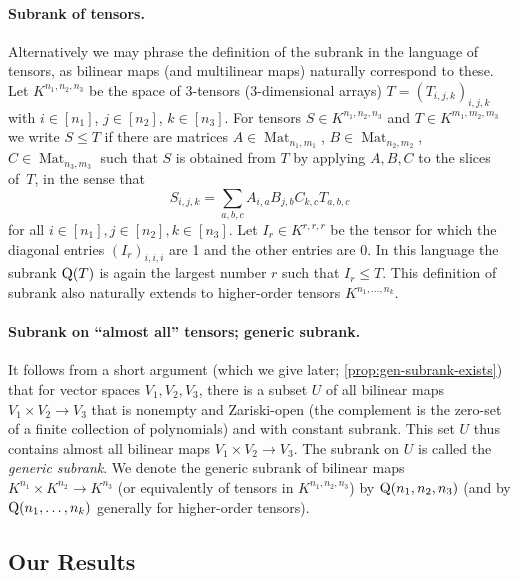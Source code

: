 \documentclass[11pt]{article}
\theoremstyle{definition}
\theoremstyle{remark}
\newcommand{\subrank}{{\rm Q}}
\newcommand{\gensubrank}{{\rm Q}}
\newcommand{\Mat}{\operatorname{Mat}}
\begin{document}
\paragraph{Subrank of tensors.} Alternatively we may phrase the definition of the subrank in the language of tensors, as bilinear maps (and multilinear maps) naturally correspond to these. Let $K^{n_1, n_2, n_3}$ be the space of 3-tensors (3-dimensional arrays) $T = (T_{i,j,k})_{i,j,k}$ with $i \in [n_1]$, $j \in [n_2]$, $k \in [n_3]$. For tensors $S \in K^{n_1, n_2, n_3}$ and $T \in K^{m_1, m_2, m_3}$ we write $S \leq T$ if there are matrices $A \in \Mat_{n_1, m_1}$, $B \in \Mat_{n_2, m_2}$, $C \in \Mat_{n_3, m_3}$ such that $S$ is obtained from $T$ by applying $A,B,C$ to the slices of~$T$, in the sense that
\[
S_{i,j,k} = \sum_{a,b,c} A_{i,a} B_{j,b} C_{k,c} T_{a,b,c}
\]
for all $i \in [n_1], j \in [n_2], k \in [n_3]$. Let $I_r \in K^{r,r,r}$ be the tensor for which the diagonal entries $(I_r)_{i,i,i}$ are 1 and the other entries are 0. In this language the subrank $\subrank(T)$ is again the largest number $r$ such that $I_r \leq T$. This definition of subrank also naturally extends to higher-order tensors $K^{n_1, \ldots, n_k}$.

\paragraph{Subrank on ``almost all'' tensors; generic subrank.}
It follows from a short argument (which we give later; \autoref{prop:gen-subrank-exists}) that for vector spaces $V_1,V_2,V_3$, there is a subset $U$ of all bilinear maps $V_1 \times V_2 \to V_3$ that is nonempty and Zariski-open (the complement is the zero-set of a finite collection of polynomials) and with constant subrank. This set $U$ thus contains almost all bilinear maps $V_1 \times V_2 \to V_3$. The subrank on $U$ is called the \emph{generic subrank}. We denote the generic subrank of bilinear maps $K^{n_1} \times K^{n_2} \to K^{n_3}$ (or equivalently of tensors in $K^{n_1, n_2, n_3}$) by $\gensubrank(n_1, n_2, n_3)$ (and by $\gensubrank(n_1, \ldots, n_k)$ generally for higher-order tensors).



%



\subsection{Our Results}\label{subsec:results}

%
\end{document}
